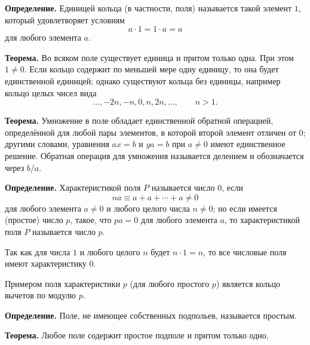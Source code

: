 \begin{rusblock}
\textbf{Определение.} Единицей кольца (в частности, поля) называется такой элемент $1$, который удовлетворяет условиям
\[
a\cdot1=1\cdot a=a
\]
для любого элемента $a$.

\textbf{Теорема.} Во всяком поле существует единица и притом только одна. При этом $1\ne0$. Если кольцо содержит по меньшей мере одну единицу, то она будет единственной единицей; однако существуют кольца без единицы, например кольцо целых чисел вида
\[
\ldots,-2n,-n,0,n,2n,\ldots,\qquad n>1.
\]
\end{rusblock}

\begin{rusblock}
\textbf{Теорема.} Умножение в поле обладает единственной обратной операцией, определённой для любой пары элементов, в которой второй элемент отличен от $0$; другими словами, уравнения $ax=b$ и $ya=b$ при $a\ne0$ имеют единственное решение. Обратная операция для умножения называется делением и обозначается через $b/a$.
\end{rusblock}

\begin{rusblock}
\textbf{Определение.} Характеристикой поля $P$ называется число $0$, если
\[
na\equiv a+a+\cdots+a\ne0
\]
для любого элемента $a\ne0$ и любого целого числа $n\ne0$; но если имеется (простое) число $p$, такое, что $pa=0$ для любого элемента $a$, то характеристикой поля $P$ называется число $p$.

Так как для числа $1$ и любого целого $n$ будет $n\cdot1=n$, то все числовые поля имеют характеристику $0$.

Примером поля характеристики $p$ (для любого простого $p$) является кольцо вычетов по модулю $p$.

\textbf{Определение.} Поле, не имеющее собственных подпольев, называется простым.

\textbf{Теорема.} Любое поле содержит простое подполе и притом только одно.
\end{rusblock}

